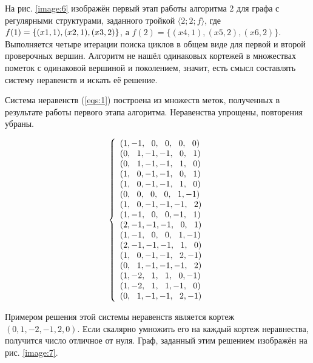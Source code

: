 \documentclass[14pt]{mmcs_article}
\begin{document}
На рис. \ref{image:6} изображён первый этап работы алгоритма 2 для графа с регулярными структурами, заданного тройкой $ \langle 2; 2; f\rangle $, где $ f(1) = \{ (x1, 1),\\ (x2, 1), (x3, 2) \} $, а $f(2) = \{ (x4, 1), (x5, 2), (x6, 2) \}$. Выполняется четыре итерации поиска циклов в общем виде для первой и второй проверочных вершин. Алгоритм не нашёл одинаковых кортежей в множествах пометок с одинаковой вершиной и поколением, значит, есть смысл составлять систему неравенств и искать её решение.

Система неравенств (\ref{eqs:1}) построена из множеств меток, полученных в результате работы первого этапа алгоритма. Неравенства упрощены, повторения убраны.

\begin{equation}
  \centering
    \left\{
      \begin{array}{ll}
        (1,-1,\ \ 0,\ \ 0,\ \ 0,\ \ 0)\\
        (0,\ \ 1,-1,-1,\ \ 0,\ \ 1)\\
        (0,\ \ 1,-1,-1,\ \ 1,\ \ 0)\\
        (1,\ \ 0,-1,-1,\ \ 0,\ \ 1)\\
        (1,\ \ 0,-1,-1,\ \ 1,\ \ 0)\\
        (0,\ \ 0,\ \ 0,\ \ 0,\ \ 1,-1)\\
        (1,\ \ 0,-1,-1,-1,\ \ 2)\\
        (1,-1,\ \ 0,\ \ 0,-1,\ \ 1)\\
        (2,-1,-1,-1,\ \ 0,\ \ 1)\\
        (1,-1,\ \ 0,\ \ 0,\ \ 1,-1)\\
        (2,-1,-1,-1,\ \ 1,\ \ 0)\\
        (1,\ \ 0,-1,-1,\ \ 2,-1)\\
        (0,\ \ 1,-1,-1,-1,\ \ 2)\\
        (1,-2,\ \ 1,\ \ 1,\ \ 0,-1)\\
        (1,-2,\ \ 1,\ \ 1,-1,\ \ 0)\\
        (0,\ \ 1,-1,-1,\ \ 2,-1)\\
      \end{array}
    \right.
  \label{eqs:1}
\end{equation}

Примером решения этой системы неравенств является кортеж\\ $(0, 1, -2, -1, 2, 0)$. Если скалярно умножить его на каждый кортеж неравнества, получится число отличное от нуля. Граф, заданный этим решением изображён на рис. \ref{image:7}.
\end{document}

